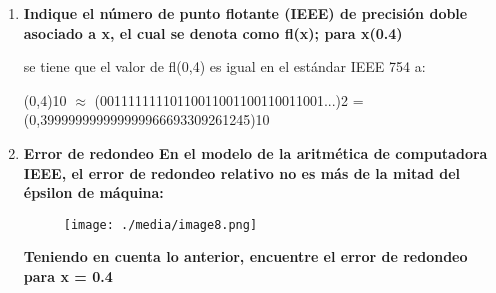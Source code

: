 \documentclass[12pt]{article}
\renewcommand{\_}{\kern-1.5pt\textunderscore\kern-1.5pt}
\begin{document}
\begin{enumerate}
\vspace{\baselineskip}
	\item {\fontsize{10pt}{12.0pt}\selectfont \textbf{ Indique el número de punto ﬂotante (IEEE) de precisión doble asociado a x, el cual se denota como fl(x); para x(0.4)}\par}\par

\begin{justify}
{\fontsize{10pt}{12.0pt}\selectfont se tiene que el valor de fl(0,4) es igual en el estándar IEEE 754 a: \par}
\end{justify}\par

\begin{justify}
{\fontsize{10pt}{12.0pt}\selectfont (0,4)10 $ \approx $  (00111111110110011001100110011001...)2 = (0,399999999999999966693309261245)10\par}
\end{justify}\par


\vspace{\baselineskip}
\setlength{\parskip}{8.04pt}
\setlength{\parskip}{0.0pt}
	\item {\fontsize{10pt}{12.0pt}\selectfont \textbf{Error de redondeo En el modelo de la aritmética de computadora IEEE, el error de redondeo relativo no es más de la mitad del épsilon de máquina:}\par}\par




\begin{figure}[H]
	\begin{Center}
		\texttt{[image: ./media/image8.png]}
	\end{Center}
\end{figure}



\par

\begin{justify}
{\fontsize{10pt}{12.0pt}\selectfont \textbf{Teniendo en cuenta lo anterior, encuentre el error de redondeo para x = 0.4}\par}
\end{justify}\par



\end{enumerate}
\end{document}

